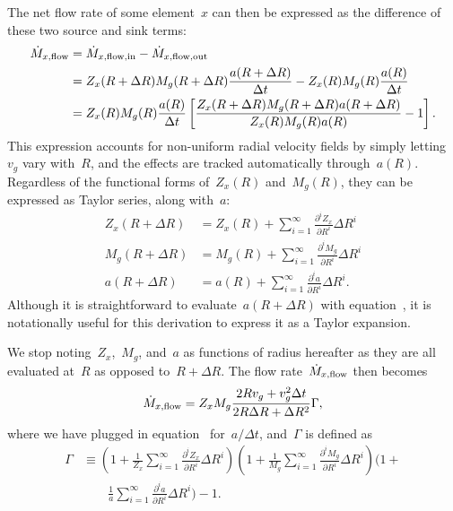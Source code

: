 \documentclass[main.tex]{subfiles}
\begin{document}
The net flow rate of some element~$x$ can then be expressed as the difference
of these two source and sink terms:
\begin{equation}\begin{split}
\dot{M}_{x,\text{flow}} &= \dot{M}_{x,\text{flow},\text{in}} -
\dot{M}_{x,\text{flow},\text{out}}
\\
&= Z_x(R + \Delta R) M_g(R + \Delta R) \frac{a(R + \Delta R)}{\Delta t} -
Z_x(R) M_g(R) \frac{a(R)}{\Delta t}
\\
&= Z_x(R) M_g(R) \frac{a(R)}{\Delta t}
\left[
\frac{Z_x(R + \Delta R) M_g(R + \Delta R) a(R + \Delta R)}{Z_x(R) M_g(R) a(R)}
- 1\right].
\label{outflows:eq:flowin-minus-flowout}
\end{split}\end{equation}
This expression accounts for non-uniform radial velocity fields by simply
letting~$v_g$ vary with~$R$, and the effects are tracked automatically
through~$a(R)$.
Regardless of the functional forms of~$Z_x(R)$ and~$M_g(R)$, they can be
expressed as Taylor series, along with~$a$:
\begin{subequations}\begin{align}
Z_x(R + \Delta R) &= Z_x(R) + \sum_{i = 1}^\infty
\frac{\partial^i Z_x}{\partial R^i} \Delta R^i
\\
M_g(R + \Delta R) &= M_g(R) + \sum_{i = 1}^\infty
\frac{\partial^i M_g}{\partial R^i} \Delta R^i
\\
a(R + \Delta R) &= a(R) + \sum_{i = 1}^\infty
\frac{\partial^i a}{\partial R^i} \Delta R^i.
\end{align}\end{subequations}
Although it is straightforward to evaluate~$a(R + \Delta R)$ with
equation~, it is notationally useful for this
derivation to express it as a Taylor expansion.
\par
We stop noting~$Z_x$,~$M_g$, and~$a$ as functions of radius hereafter as they
are all evaluated at~$R$ as opposed to~$R + \Delta R$.
The flow rate~$\dot{M}_{x,\text{flow}}$ then becomes
\begin{equation}
\dot{M}_{x,\text{flow}} = Z_x M_g
\frac{2 R v_g + v_g^2 \Delta t}{2 R \Delta R + \Delta R^2} \Gamma,
\end{equation}
where we have plugged in equation~
for~$a / \Delta t$, and~$\Gamma$ is defined as
\begin{equation}\begin{split}
\Gamma &\equiv
\left(1 + \frac{1}{Z_x}
\sum_{i = 1}^\infty \frac{\partial^i Z_x}{\partial R^i} \Delta R^i\right)
\left(1 + \frac{1}{M_g}
\sum_{i = 1}^\infty \frac{\partial^i M_g}{\partial R^i} \Delta R^i\right)
\Bigg(1 +
\\
&\qquad
\frac{1}{a}
\sum_{i = 1}^\infty \frac{\partial^i a}{\partial R^i} \Delta R^i\Bigg) - 1.
\end{split}\end{equation}
\end{document}
